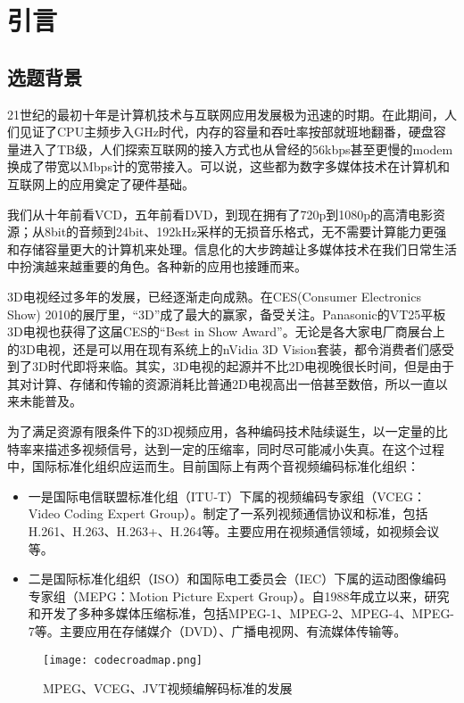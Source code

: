 

\chapter{引言}
\label{cha:intro}


\section{选题背景}
\label{sec:background}

21世纪的最初十年是计算机技术与互联网应用发展极为迅速的时期。在此期间，人们见证了CPU主频步入GHz时代，内存的容量和吞吐率按部就班地翻番，硬盘容量进入了TB级，人们探索互联网的接入方式也从曾经的56kbps甚至更慢的modem换成了带宽以Mbps计的宽带接入。可以说，这些都为数字多媒体技术在计算机和互联网上的应用奠定了硬件基础。

我们从十年前看VCD，五年前看DVD，到现在拥有了720p到1080p的高清电影资源；从8bit的音频到24bit、192kHz采样的无损音乐格式，无不需要计算能力更强和存储容量更大的计算机来处理。信息化的大步跨越让多媒体技术在我们日常生活中扮演越来越重要的角色。各种新的应用也接踵而来。

3D电视经过多年的发展，已经逐渐走向成熟。在CES(Consumer Electronics Show) 2010的展厅里，“3D”成了最大的赢家，备受关注。Panasonic的VT25平板3D电视也获得了这届CES的“Best in Show Award”。无论是各大家电厂商展台上的3D电视，还是可以用在现有系统上的nVidia 3D Vision套装，都令消费者们感受到了3D时代即将来临。其实，3D电视的起源并不比2D电视晚很长时间\cite{smolic2007coding}，但是由于其对计算、存储和传输的资源消耗比普通2D电视高出一倍甚至数倍，所以一直以来未能普及。

为了满足资源有限条件下的3D视频应用，各种编码技术陆续诞生，以一定量的比特率来描述多视频信号，达到一定的压缩率，同时尽可能减小失真。在这个过程中，国际标准化组织应运而生。目前国际上有两个音视频编码标准化组织：
\begin{itemize}
\item 一是国际电信联盟标准化组（ITU-T）下属的视频编码专家组（VCEG：Video Coding Expert Group）。制定了一系列视频通信协议和标准，包括H.261、H.263、H.263+、H.264等。主要应用在视频通信领域，如视频会议等。
\item 二是国际标准化组织（ISO）和国际电工委员会（IEC）下属的运动图像编码专家组（MEPG：Motion Picture Expert Group）。自1988年成立以来，研究和开发了多种多媒体压缩标准，包括MPEG-1、MPEG-2、MPEG-4、MPEG-7等。主要应用在存储媒介（DVD）、广播电视网、有流媒体传输等。
\end{itemize}
\begin{figure}[htbp]
\begin{center}
\texttt{[image: codecroadmap.png]}
\caption{MPEG、VCEG、JVT视频编解码标准的发展}
\label{fig:codecroadmap}
\end{center}
\end{figure}

